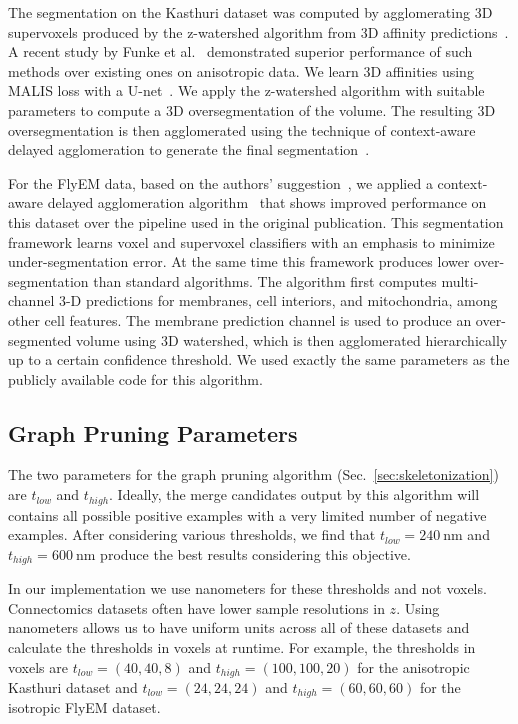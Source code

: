 The segmentation on the Kasthuri dataset was computed by agglomerating 3D supervoxels produced by the z-watershed algorithm from 3D affinity predictions~\cite{zlateski2015image}. A recent study by Funke et al.~\cite{schlegel2017learning} demonstrated superior performance of such methods over existing ones on anisotropic data. We learn 3D affinities using MALIS loss with a U-net~\cite{Turaga:2009,ronneberger2015u}. We apply the z-watershed algorithm with suitable parameters to compute a 3D oversegmentation of the volume. The resulting 3D oversegmentation is then agglomerated using the technique of context-aware delayed agglomeration to generate the final segmentation~\cite{10.1371/journal.pone.0125825}.

For the FlyEM data, based on the authors' suggestion~\cite{takemura2017connectome}, we applied a context-aware delayed agglomeration algorithm~\cite{10.1371/journal.pone.0125825} that shows improved performance on this dataset over the pipeline used in the original publication. This segmentation framework learns voxel and supervoxel classifiers with an emphasis to minimize under-segmentation error. At the same time this framework produces lower over-segmentation than standard algorithms. The algorithm first computes multi-channel 3-D predictions for membranes, cell interiors, and mitochondria, among other cell features. The membrane prediction channel is used to produce an over-segmented volume using 3D watershed, which is then agglomerated hierarchically up to a certain confidence threshold. We used exactly the same parameters as the publicly available code for this algorithm.

\subsection{Graph Pruning Parameters}

The two parameters for the graph pruning algorithm (Sec.~\ref{sec:skeletonization}) are $t_{low}$ and $t_{high}$. Ideally, the merge candidates output by this algorithm will contains all possible positive examples with a very limited number of negative examples. After considering various thresholds, we find that $t_{low} = \SI{240}{\nano\meter}$ and $t_{high} = \SI{600}{\nano\meter}$ produce the best results considering this objective.

In our implementation we use nanometers for these thresholds and not voxels. Connectomics datasets often have lower sample resolutions in $z$. Using nanometers allows us to have uniform units across all of these datasets and calculate the thresholds in voxels at runtime. For example, the thresholds in voxels are $t_{low} = (40, 40, 8)$ and $t_{high} = (100, 100, 20)$ for the anisotropic Kasthuri dataset and $t_{low} = (24, 24, 24)$ and $t_{high} = (60, 60, 60)$ for the isotropic FlyEM dataset.

